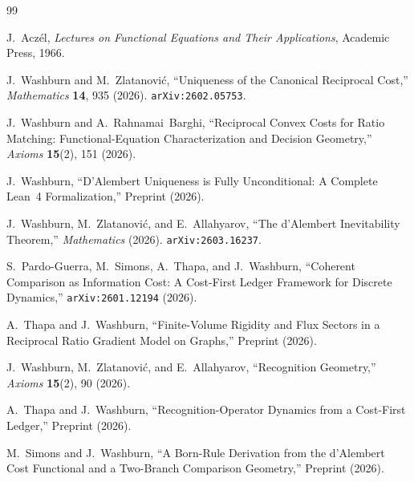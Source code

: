 \documentclass[11pt]{article}
\theoremstyle{definition}
\theoremstyle{remark}
\begin{document}
\begin{thebibliography}{99}

J.~Acz\'el,
\emph{Lectures on Functional Equations and Their Applications},
Academic Press, 1966.

J.~Washburn and M.~Zlatanovi\'c,
``Uniqueness of the Canonical Reciprocal Cost,''
\emph{Mathematics} \textbf{14}, 935 (2026).
\texttt{arXiv:2602.05753}.

J.~Washburn and A.~Rahnamai~Barghi,
``Reciprocal Convex Costs for Ratio Matching: Functional-Equation
Characterization and Decision Geometry,''
\emph{Axioms} \textbf{15}(2), 151 (2026).

J.~Washburn,
``D'Alembert Uniqueness is Fully Unconditional: A Complete Lean~4
Formalization,''
Preprint (2026).

J.~Washburn, M.~Zlatanovi\'c, and E.~Allahyarov,
``The d'Alembert Inevitability Theorem,''
\emph{Mathematics} (2026).
\texttt{arXiv:2603.16237}.

S.~Pardo-Guerra, M.~Simons, A.~Thapa, and J.~Washburn,
``Coherent Comparison as Information Cost: A Cost-First Ledger
Framework for Discrete Dynamics,''
\texttt{arXiv:2601.12194} (2026).

A.~Thapa and J.~Washburn,
``Finite-Volume Rigidity and Flux Sectors in a Reciprocal Ratio
Gradient Model on Graphs,''
Preprint (2026).

J.~Washburn, M.~Zlatanovi\'c, and E.~Allahyarov,
``Recognition Geometry,''
\emph{Axioms} \textbf{15}(2), 90 (2026).

A.~Thapa and J.~Washburn,
``Recognition-Operator Dynamics from a Cost-First Ledger,''
Preprint (2026).

M.~Simons and J.~Washburn,
``A Born-Rule Derivation from the d'Alembert Cost Functional
and a Two-Branch Comparison Geometry,''
Preprint (2026).

\end{thebibliography}
\end{document}
